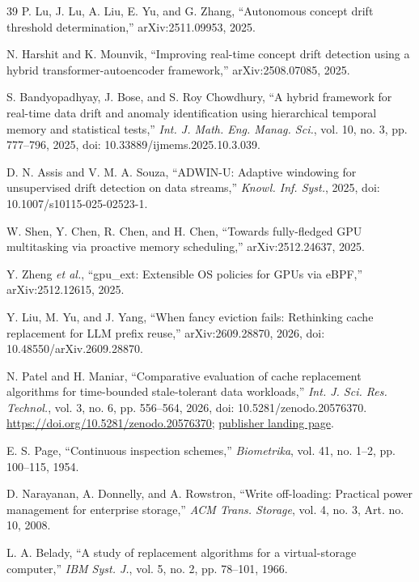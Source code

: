 \documentclass[10pt,twocolumn,a4paper]{IEEEtran}
\begin{document}
\begin{thebibliography}{39}
 P. Lu, J. Lu, A. Liu, E. Yu, and G. Zhang, ``Autonomous concept
drift threshold determination,'' arXiv:2511.09953, 2025.

 N. Harshit and K. Mounvik, ``Improving real-time concept drift
detection using a hybrid transformer-autoencoder framework,''
arXiv:2508.07085, 2025.

 S. Bandyopadhyay, J. Bose, and S. Roy Chowdhury, ``A hybrid
framework for real-time data drift and anomaly identification using
hierarchical temporal memory and statistical tests,'' \emph{Int. J. Math. Eng.
Manag. Sci.}, vol. 10, no. 3, pp. 777--796, 2025, doi:
10.33889/ijmems.2025.10.3.039.

 D. N. Assis and V. M. A. Souza, ``ADWIN-U: Adaptive windowing
for unsupervised drift detection on data streams,'' \emph{Knowl. Inf. Syst.},
2025, doi: 10.1007/s10115-025-02523-1.

 W. Shen, Y. Chen, R. Chen, and H. Chen, ``Towards fully-fledged
GPU multitasking via proactive memory scheduling,'' arXiv:2512.24637, 2025.

 Y. Zheng \emph{et al.}, ``gpu\_ext: Extensible OS policies for
GPUs via eBPF,'' arXiv:2512.12615, 2025.

 Y. Liu, M. Yu, and J. Yang, ``When fancy eviction fails:
Rethinking cache replacement for LLM prefix reuse,'' arXiv:2609.28870, 2026,
doi: 10.48550/arXiv.2609.28870.

 N. Patel and H. Maniar, ``Comparative evaluation of cache
replacement algorithms for time-bounded stale-tolerant data workloads,''
\emph{Int. J. Sci. Res. Technol.}, vol. 3, no. 6, pp. 556--564, 2026, doi:
10.5281/zenodo.20576370. \url{https://doi.org/10.5281/zenodo.20576370};
\href{https://ijsrtjournal.com/article/comparative-evaluation-of-cache-replacement-algorithms-for-time-bounded-stale-tolerant-data-workloads}{publisher landing page}.

 E. S. Page, ``Continuous inspection schemes,'' \emph{Biometrika},
vol. 41, no. 1--2, pp. 100--115, 1954.

 D. Narayanan, A. Donnelly, and A. Rowstron, ``Write
off-loading: Practical power management for enterprise storage,'' \emph{ACM
Trans. Storage}, vol. 4, no. 3, Art. no. 10, 2008.

 L. A. Belady, ``A study of replacement algorithms for a
virtual-storage computer,'' \emph{IBM Syst. J.}, vol. 5, no. 2, pp. 78--101,
1966.


\end{thebibliography}
\end{document}
